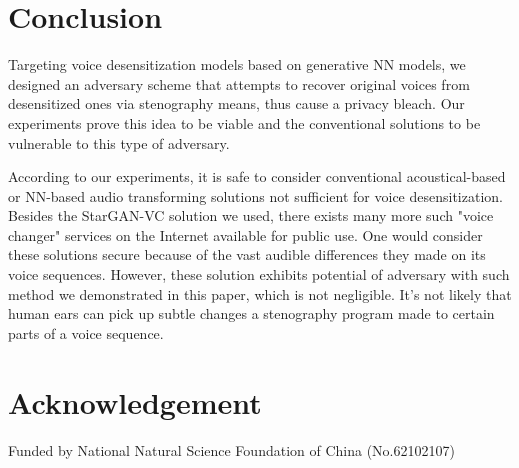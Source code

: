 \documentclass[conference]{IEEEtran}
\begin{document}
\section{Conclusion}
\label{seg:conclusion}

Targeting voice desensitization models based on generative NN models, we designed an adversary scheme that attempts to recover original voices from desensitized ones via stenography means, thus cause a privacy bleach. Our experiments prove this idea to be viable and the conventional solutions to be vulnerable to this type of adversary.

According to our experiments, it is safe to consider conventional acoustical-based or NN-based audio transforming solutions not sufficient for voice desensitization. Besides the StarGAN-VC solution we used, there exists many more such "voice changer" services on the Internet available for public use. One would consider these solutions secure because of the vast audible differences they made on its voice sequences. However, these solution exhibits potential of adversary with such method we demonstrated in this paper, which is not negligible. It's not likely that human ears can pick up subtle changes a stenography program made to certain parts of a voice sequence.

\section{Acknowledgement}
Funded by National Natural Science Foundation of China (No.62102107)
\end{document}
